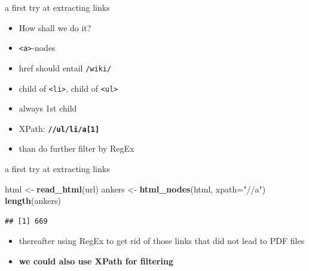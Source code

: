 \documentclass[ignorenonframetext,]{beamer}
\newenvironment{Shaded}{\begin{snugshade}}{\end{snugshade}}
\newcommand{\KeywordTok}[1]{\textcolor[rgb]{0.13,0.29,0.53}{\textbf{{#1}}}}
\newcommand{\DataTypeTok}[1]{\textcolor[rgb]{0.13,0.29,0.53}{{#1}}}
\newcommand{\StringTok}[1]{\textcolor[rgb]{0.31,0.60,0.02}{{#1}}}
\newcommand{\NormalTok}[1]{{#1}}
\providecommand{\tightlist}{%
  \setlength{\itemsep}{0pt}\setlength{\parskip}{0pt}}
\begin{document}
\begin{frame}[fragile]{a first try at extracting links}

\begin{itemize}
\item
  How shall we do it?
\item
  \texttt{\textless{}a\textgreater{}}-nodes
\item
  href should entail \texttt{/wiki/}
\item
  child of \texttt{\textless{}li\textgreater{}}, child of
  \texttt{\textless{}ul\textgreater{}}
\item
  always 1st child
\item
  XPath: \textbf{\texttt{//ul/li/a{[}1{]}}}
\item
  than do further filter by RegEx
\end{itemize}

\end{frame}

\begin{frame}[fragile]{a first try at extracting links}

\begin{Shaded}
\begin{Highlighting}[]
\NormalTok{html   <-}\StringTok{ }\KeywordTok{read_html}\NormalTok{(url)}
\NormalTok{ankers <-}\StringTok{ }\KeywordTok{html_nodes}\NormalTok{(html, }\DataTypeTok{xpath=}\StringTok{"//a"}\NormalTok{)}
\KeywordTok{length}\NormalTok{(ankers)}
\end{Highlighting}
\end{Shaded}

\begin{verbatim}
## [1] 669
\end{verbatim}

\begin{itemize}
\tightlist
\item
  thereafter using RegEx to get rid of those links that did not lead to
  PDF files
\item
  \textbf{we could also use XPath for filtering}
\end{itemize}

\end{frame}
\end{document}
